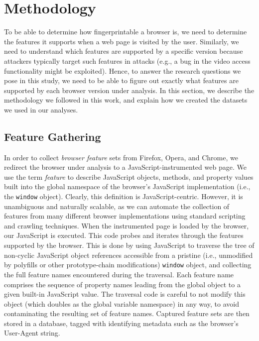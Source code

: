 \section{Methodology}
\label{sec:methodology}

To be able to determine how fingerprintable a browser is, we need to
determine the features it supports when a web page is visited by the
user. Similarly, we need to understand which features are supported by
a specific version because attackers typically target such features in
attacks (e.g., a bug in the video access functionality might be
exploited). Hence, to answer the        research questions we pose in this
study, we need to be able to figure out exactly what features are
supported by each browser version under analysis. In this section, we
describe the methodology we followed in this work, and explain how we
created the datasets we used in our analyses.

\subsection{Feature Gathering}
\label{sec:feature-gathering}

In order to collect \textit{browser feature} sets from Firefox, Opera, and
Chrome, we redirect the browser under analysis to a
JavaScript-instrumented web page. We use the term \textit{feature} to
describe JavaScript objects, methods, and property values built into the
global namespace of the browser's JavaScript implementation (i.e., the
\texttt{window} object).  Clearly, this definition is
JavaScript-centric. However, it is unambiguous and naturally scalable,
as we can automate the collection of features from many different
browser implementations using standard scripting and crawling
techniques. When the instrumented page is loaded by the browser, our
JavaScript is executed.  This code probes and iterates through the
features supported by the browser. This is done by using JavaScript to
traverse the tree of non-cyclic JavaScript object references accessible
from a pristine (i.e., unmodified by polyfills or other prototype-chain
modifications) \texttt{window} object, and collecting the full feature
names encountered during the traversal. Each feature name comprises the
sequence of property names leading from the global object to a given
built-in JavaScript value. The traversal code is careful to not modify
this object (which doubles as the global variable namespace) in any way,
to avoid contaminating the resulting set of feature names. Captured
feature sets are then stored in a database, tagged with identifying
metadata such as the browser's User-Agent string.

